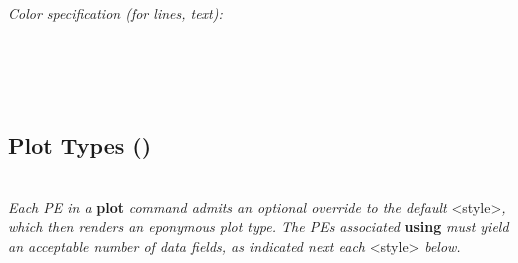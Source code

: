 \textit{Color specification (for lines, text):}\\
\\
\\
\\
\\



\subsection*{Plot Types ()}
\\
\textit{Each PE in a }\textbf{plot}\textit{ command admits an optional override to the default }<style>\textit{, which then renders an eponymous plot type. The PE\textquotesingle s associated }\textbf{using}\textit{ must yield an acceptable number of data fields, as indicated next each }<style>\textit{ below.}

